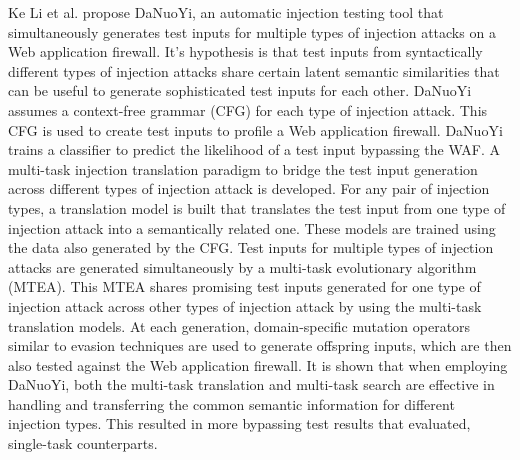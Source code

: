 Ke Li et al. \cite{rw/derLI} propose DaNuoYi, an automatic injection testing tool that simultaneously generates test inputs for multiple types of injection attacks on a Web application firewall. It's hypothesis is that test inputs from syntactically different types of injection attacks share certain latent semantic similarities that can be useful to generate sophisticated test inputs for each other. DaNuoYi assumes a context-free grammar (CFG) for each type of injection attack. This CFG is used to create test inputs to profile a Web application firewall. DaNuoYi trains a classifier to predict the likelihood of a test input bypassing the WAF. A multi-task injection translation paradigm to bridge the test input generation across different types of injection attack is developed. For any pair of injection types, a translation model is built that translates the test input from one type of injection
attack into a semantically related one. These models are trained using the data also generated by the CFG. Test inputs for multiple types of injection attacks are generated simultaneously by a multi-task evolutionary algorithm (MTEA). This MTEA shares promising test inputs generated for one type of injection attack across other types of injection attack by using the multi-task translation models.
At each generation, domain-specific mutation operators similar to evasion techniques are used to generate offspring inputs, which are then also tested against the Web application firewall.
It is shown that when employing DaNuoYi, both the multi-task translation and multi-task search are effective in handling and transferring the common semantic information for different injection types. This resulted in more bypassing test results that evaluated, single-task counterparts.
